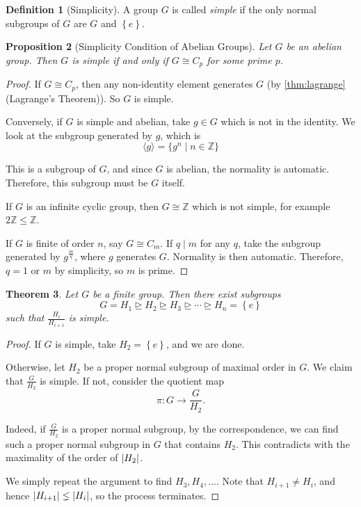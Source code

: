 \documentclass{article}
\newtheorem{theorem}{Theorem}[section]
\newtheorem{proposition}[theorem]{Proposition}
\theoremstyle{definition}
\newtheorem{definition}[theorem]{Definition}
\theoremstyle{remark}
\DeclarePairedDelimiter{\abs}{\lvert}{\rvert}
\newcommand{\Bqty}[1]{\left\{#1\right\}}
\newcommand{\angBrac}[1]{\langle #1\rangle}
\newcommand{\set}[2]{\{#1\mid #2\}}
\newcommand{\flatfrac}[2]{\frac{#1}{#2}}
\newcommand{\functiondomain}[3]{#1:#2\to #3}
\newcommand{\isomorphic}{\cong}
\newcommand{\normalsup}{\trianglerighteq}
\newcommand{\subgroup}{\leq}
\newcommand{\divides}{\mid}
\newcommand{\ZZ}{\mathbb{Z}}
\begin{document}
\begin{definition}[Simplicity]
    \label{def:simplicity}%
    A group \(G\) is called \emph{simple} if the only normal subgroups of \(G\) are \(G\) and \(\Bqty{e}\).
\end{definition}

\begin{proposition}[Simplicity Condition of Abelian Groups]
    \label{prop:abelian-group-simplicity}%
    Let \(G\) be an abelian group. Then \(G\) is simple if and only if \(G \isomorphic C_p\) for some prime \(p\).
\end{proposition}

\begin{proof}
    If \(G \isomorphic C_p\), then any non-identity element generates \(G\) (by \autoref{thm:lagrange} (Lagrange's Theorem)). So \(G\) is simple.

    Conversely, if \(G\) is simple and abelian, take \(g \in G\) which is not in the identity. We look at the subgroup generated by \(g\), which is
    \[
        \angBrac{g} = \set{g^n}{n \in \ZZ}
    \]

    This is a subgroup of \(G\), and since \(G\) is abelian, the normality is automatic. Therefore, this subgroup must be \(G\) itself.

    If \(G\) is an infinite cyclic group, then \(G \isomorphic \ZZ\) which is not simple, for example \(2\ZZ \subgroup \ZZ\).

    If \(G\) is finite of order \(n\), say \(G \isomorphic C_m\). If \(q \divides m\) for any \(q\), take the subgroup generated by \(g^{\frac{m}{q}}\), where \(g\) generates \(G\). Normality is then automatic. Therefore, \(q = 1\) or \(m\) by simplicity, so \(m\) is prime.
\end{proof}

\begin{theorem}
    \label{thm:infinite-chain-normal-subgroup}%
    Let \(G\) be a finite group. Then there exist subgroups
    \[
        G = H_1 \normalsup H_2 \normalsup H_3 \normalsup \cdots \normalsup H_n = \Bqty{e}
    \]
    such that \(\flatfrac{H_i}{H_{i + 1}}\) is simple.
\end{theorem}

\begin{proof}
    If \(G\) is simple, take \(H_2 = \Bqty{e}\), and we are done.

    Otherwise, let \(H_2\) be a proper normal subgroup of maximal order in \(G\). We claim that \(\flatfrac{G}{H_2}\) is simple. If not, consider the quotient map
    \[
        \functiondomain{\pi}{G}{\flatfrac{G}{H_2}}.
    \]

    Indeed, if \(\flatfrac{G}{H_2}\) is a proper normal subgroup, by the correspondence, we can find such a proper normal subgroup in \(G\) that contains \(H_2\). This contradicts with the maximality of the order of \(\abs{H_2}\).

    We simply repeat the argument to find \(H_3, H_4, \ldots\). Note that \(H_{i + 1} \neq H_i\), and hence \(\abs{H_{i + 1}} \lneq \abs{H_i}\), so the process terminates.
\end{proof}
\end{document}
